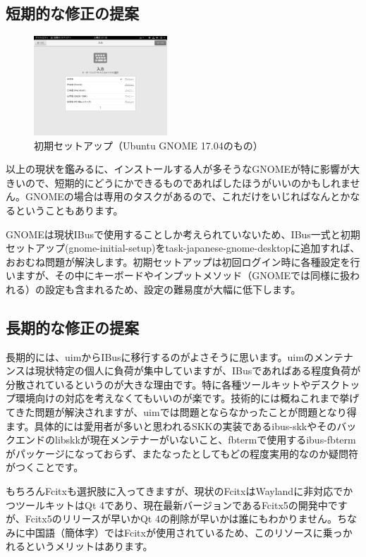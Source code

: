 \documentclass[mingoth,a4paper]{jsarticle}
\begin{document}
\subsection{短期的な修正の提案}
\begin{figure}
    \begin{center}
        \includegraphics[width=5cm]{image201708/gnome-initial-setup_gray.png}
        \caption{初期セットアップ（Ubuntu GNOME 17.04のもの）}
    \end{center}
\end{figure}
以上の現状を鑑みるに、インストールする人が多そうなGNOMEが特に影響が大きいので、短期的にどうにかできるものであればしたほうがいいのかもしれません。GNOMEの場合は専用のタスクがあるので、これだけをいじればなんとかなるということもあります。

GNOMEは現状IBusで使用することしか考えられていないため、IBus一式と初期セットアップ(gnome-initial-setup)をtask-japanese-gnome-desktopに追加すれば、おおむね問題が解決します。初期セットアップは初回ログイン時に各種設定を行いますが、その中にキーボードやインプットメソッド（GNOMEでは同様に扱われる）の設定も含まれるため、設定の難易度が大幅に低下します。

\subsection{長期的な修正の提案}

長期的には、uimからIBusに移行するのがよさそうに思います。uimのメンテナンスは現状特定の個人に負荷が集中していますが、IBusであればある程度負荷が分散されているというのが大きな理由です。特に各種ツールキットやデスクトップ環境向けの対応を考えなくてもいいのが楽です。技術的には概ねこれまで挙げてきた問題が解決されますが、uimでは問題とならなかったことが問題となり得ます。具体的には愛用者が多いと思われるSKKの実装であるibus-skkやそのバックエンドのlibskkが現在メンテナーがいないこと、fbtermで使用するibus-fbtermがパッケージになっておらず、またなったとしてもどの程度実用的なのか疑問符がつくことです。

もちろんFcitxも選択肢に入ってきますが、現状のFcitxはWaylandに非対応でかつツールキットはQt
4であり、現在最新バージョンであるFcitx5の開発中ですが、Fcitx5のリリースが早いかQt
4の削除が早いかは誰にもわかりません。ちなみに中国語（簡体字）ではFcitxが使用されているため、このリソースに乗っかれるというメリットはあります。
\end{document}
